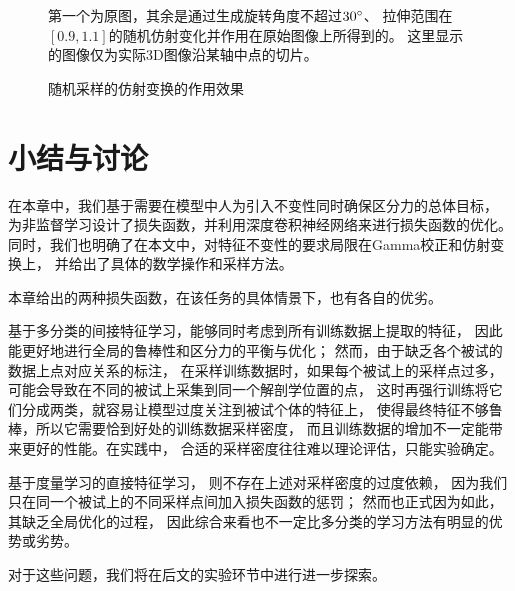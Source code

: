 \begin{figure}[H]
    {
        \caption{随机采样的仿射变换的作用效果}
        \label{fig:cnn:aug:affine}
    }
    \footnotesize
    第一个为原图，其余是通过生成旋转角度不超过$30\degree$、
    拉伸范围在$[0.9, 1.1]$的随机仿射变化并作用在原始图像上所得到的。
    这里显示的图像仅为实际3D图像沿某轴中点的切片。
\end{figure}


\section{小结与讨论\label{sec:cnn:discuss}}
在本章中，我们基于需要在模型中人为引入不变性同时确保区分力的总体目标，
为非监督学习设计了损失函数，并利用深度卷积神经网络来进行损失函数的优化。
同时，我们也明确了在本文中，对特征不变性的要求局限在Gamma校正和仿射变换上，
并给出了具体的数学操作和采样方法。

本章给出的两种损失函数，在该任务的具体情景下，也有各自的优劣。

基于多分类的间接特征学习，能够同时考虑到所有训练数据上提取的特征，
因此能更好地进行全局的鲁棒性和区分力的平衡与优化；
然而，由于缺乏各个被试的数据上点对应关系的标注，
在采样训练数据时，如果每个被试上的采样点过多，
可能会导致在不同的被试上采集到同一个解剖学位置的点，
这时再强行训练将它们分成两类，就容易让模型过度关注到被试个体的特征上，
使得最终特征不够鲁棒，所以它需要恰到好处的训练数据采样密度，
而且训练数据的增加不一定能带来更好的性能。在实践中，
合适的采样密度往往难以理论评估，只能实验确定。

基于度量学习的直接特征学习，
则不存在上述对采样密度的过度依赖，
因为我们只在同一个被试上的不同采样点间加入损失函数的惩罚；
然而也正式因为如此，其缺乏全局优化的过程，
因此综合来看也不一定比多分类的学习方法有明显的优势或劣势。

对于这些问题，我们将在后文的实验环节中进行进一步探索。


